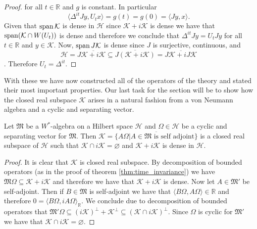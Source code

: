 \begin{proof}
for all $t\in\mathbb{R}$ and $g$ is constant. In particular
\begin{equation}
\langle \Delta^{it}Jy,U_tx\rangle=g(t)=g(0)=\langle Jy,x\rangle.
\end{equation}
Given that $\operatorname{span} \mathcal{K}$ is dense in $\mathcal{H}$ since $\mathcal{K}+i\mathcal{K}$ is dense we have that $\operatorname{span} (\mathcal{K}\cap W(U_t))$ is dense and therefore we conclude that $\Delta^{it}Jy=U_tJy$ for all $t\in\mathbb{R}$ and $y\in\mathcal{K}$. Now, $\operatorname{span} J\mathcal{K}$ is dense since $J$ is surjective, continuous, and
\begin{equation}
\mathcal{H}=J\overline{\mathcal{K}+i\mathcal{K}}\subseteq\overline{J(\mathcal{K}+i\mathcal{K})}=\overline{J\mathcal{K}+iJ\mathcal{K}}
\end{equation}.
Therefore $U_t=\Delta^{it}.$  
\end{proof}

With these we have now constructed all of the operators of the theory and stated their most important properties. Our last task for the section will be to show how the closed real subspace $\mathcal{K}$ arises in a natural fashion from a von Neumann algebra and a cyclic and separating vector.

\begin{theorem}
Let $\mathfrak{M}$ be a $W^*$-algebra on a Hilbert space $\mathcal{H}$ and $\Omega\in\mathcal{H}$ be a cyclic and separating vector for $\mathfrak{M}$. Then $\mathcal{K}=\overline{\{A\Omega|A\in\mathfrak{M}\text{ is self adjoint}\}}$ is a closed real subspace of $\mathcal{H}$ such that $\mathcal{K}\cap i\mathcal{K}=\varnothing$ and $\mathcal{K}+i\mathcal{K}$ is dense in $\mathcal{H}$.
\end{theorem}

\begin{proof}
It is clear that $\mathcal{K}$ is closed real subspace. By decomposition of bounded operators (as in the proof of theorem \ref{thm:time_invariance}) we have $\mathfrak{M}\Omega\subseteq \mathcal{K}+i\mathcal{K}$ and therefore we have that $\mathcal{K}+i\mathcal{K}$ is dense. Now let $A\in\mathfrak{M}'$ be self-adjoint. Then if $B\in\mathfrak{M}$ is self-adjoint we have that $\langle B\Omega,A\Omega\rangle\in\mathbb{R}$ and therefore $0=\langle B\Omega,iA\Omega\rangle_\mathbb{R}$. We conclude due to decomposition of bounded operators that $\mathfrak{M}'\Omega\subseteq (i\mathcal{K})^\bot+\mathcal{K}^\bot\subseteq (\mathcal{K}\cap i\mathcal{K})^\bot$. Since $\Omega$ is cyclic for $\mathfrak{M}'$ we have that $\mathcal{K}\cap i\mathcal{K}=\varnothing$.
\end{proof}

